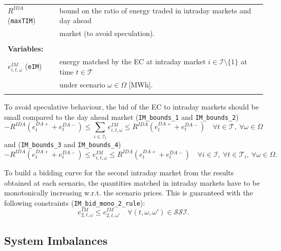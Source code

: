 \documentclass{article}
\begin{document}
\begin{tabularx}{\textwidth}{l l}
	$R^{IDA}$ (\verb|maxTIM|) & bound on the ratio of energy traded in intraday markets and day ahead \\
	& market (to avoid speculation).\\
    \\ 
       
    \textbf{Variables:} \\
    $e^{IM}_{i, t, \omega}$ (\verb|eIM|) & energy matched by the EC at intraday market $i \in \mathcal I \setminus \{1\}$ at time $t \in \mathcal{T}$ \\
    & under scenario $\omega \in \Omega$ [MWh]. \\
	\\
\end{tabularx}

To avoid speculative behaviour, the bid of the EC to intraday markets should be small compared to the day ahead market (\verb|IM_bounds_1| and \verb|IM_bounds_2|)
\begin{equation} \label{EQ:DM_IM_1}
	-R^{IDA} (e^{DA+}_{t} + e^{DA-}_{t})  \leq \sum_{i \in \mathcal{I}_t} e^{IM}_{i, t, \omega} \leq R^{IDA} (e^{DA+}_{t} + e^{DA-}_{t}) \quad \forall t \in \mathcal{T}, \ \forall \omega \in \Omega
\end{equation}
and (\verb|IM_bounds_3| and \verb|IM_bounds_4|)
\begin{equation} \label{EQ:IM_bounds_3-4}
	-R^{IDA} (e^{DA+}_{t} + e^{DA-}_{t}) \leq e^{IM}_{i, t, \omega} \leq R^{IDA} (e^{DA+}_{t} + e^{DA-}_{t}) \quad \forall i \in \mathcal{I}, \ \forall t \in \mathcal{T}_i, \ \forall \omega \in \Omega.
\end{equation}

To build a bidding curve for the second intraday market from the results obtained at each scenario, the quantities matched in intraday markets have to be monotonically increasing w.r.t. the scenario prices. This is guaranteed with the following constraints (\verb|IM_bid_mono_2_rule|):
\begin{equation} \label{EQ:lI_bid}
	e^{IM}_{2, t, \omega} \leq e^{IM}_{2, t, \omega'} \quad \forall (t, \omega, \omega') \in \mathcal{SSI}.
\end{equation}

\subsection{System Imbalances}
\end{document}
